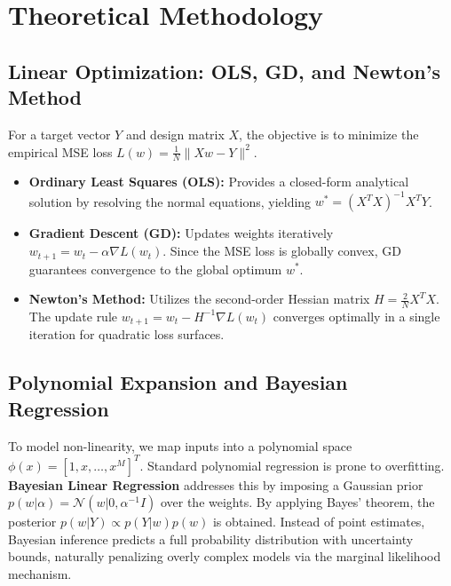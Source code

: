 \documentclass[12pt,a4paper]{article}
\begin{document}
\section{Theoretical Methodology}

\subsection{Linear Optimization: OLS, GD, and Newton's Method}
For a target vector $Y$ and design matrix $X$, the objective is to minimize the empirical MSE loss $L(w) = \frac{1}{N} \|Xw - Y\|^2$. 
\begin{itemize}
    \item \textbf{Ordinary Least Squares (OLS):} Provides a closed-form analytical solution by resolving the normal equations, yielding $w^* = (X^T X)^{-1} X^T Y$.
    \item \textbf{Gradient Descent (GD):} Updates weights iteratively $w_{t+1} = w_t - \alpha \nabla L(w_t)$. Since the MSE loss is globally convex, GD guarantees convergence to the global optimum $w^*$.
    \item \textbf{Newton's Method:} Utilizes the second-order Hessian matrix $H = \frac{2}{N} X^T X$. The update rule $w_{t+1} = w_t - H^{-1} \nabla L(w_t)$ converges optimally in a single iteration for quadratic loss surfaces.
\end{itemize}

\subsection{Polynomial Expansion and Bayesian Regression}
To model non-linearity, we map inputs into a polynomial space $\phi(x) = [1, x, \dots, x^M]^T$. Standard polynomial regression is prone to overfitting. \textbf{Bayesian Linear Regression} addresses this by imposing a Gaussian prior $p(w|\alpha) = \mathcal{N}(w|0, \alpha^{-1}I)$ over the weights. By applying Bayes' theorem, the posterior $p(w|Y) \propto p(Y|w) p(w)$ is obtained. Instead of point estimates, Bayesian inference predicts a full probability distribution with uncertainty bounds, naturally penalizing overly complex models via the marginal likelihood mechanism.
\end{document}
